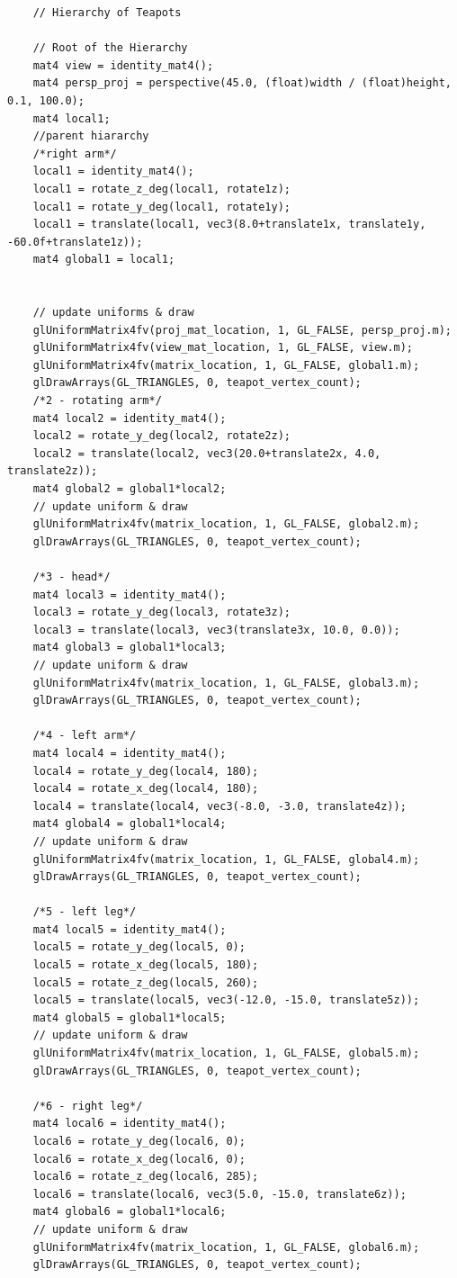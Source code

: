 \documentclass{article}
\begin{document}
\begin{lstlisting}
	// Hierarchy of Teapots

	// Root of the Hierarchy
	mat4 view = identity_mat4();
	mat4 persp_proj = perspective(45.0, (float)width / (float)height, 0.1, 100.0);
	mat4 local1;
	//parent hiararchy
	/*right arm*/
	local1 = identity_mat4();
	local1 = rotate_z_deg(local1, rotate1z);
	local1 = rotate_y_deg(local1, rotate1y);
	local1 = translate(local1, vec3(8.0+translate1x, translate1y, -60.0f+translate1z));
	mat4 global1 = local1;


	// update uniforms & draw
	glUniformMatrix4fv(proj_mat_location, 1, GL_FALSE, persp_proj.m);
	glUniformMatrix4fv(view_mat_location, 1, GL_FALSE, view.m);
	glUniformMatrix4fv(matrix_location, 1, GL_FALSE, global1.m);
	glDrawArrays(GL_TRIANGLES, 0, teapot_vertex_count);
	/*2 - rotating arm*/
	mat4 local2 = identity_mat4();
	local2 = rotate_y_deg(local2, rotate2z);
	local2 = translate(local2, vec3(20.0+translate2x, 4.0, translate2z));
	mat4 global2 = global1*local2;
	// update uniform & draw
	glUniformMatrix4fv(matrix_location, 1, GL_FALSE, global2.m);
	glDrawArrays(GL_TRIANGLES, 0, teapot_vertex_count);

	/*3 - head*/
	mat4 local3 = identity_mat4();
	local3 = rotate_y_deg(local3, rotate3z);
	local3 = translate(local3, vec3(translate3x, 10.0, 0.0));
	mat4 global3 = global1*local3;
	// update uniform & draw
	glUniformMatrix4fv(matrix_location, 1, GL_FALSE, global3.m);
	glDrawArrays(GL_TRIANGLES, 0, teapot_vertex_count);

	/*4 - left arm*/
	mat4 local4 = identity_mat4();
	local4 = rotate_y_deg(local4, 180);
	local4 = rotate_x_deg(local4, 180);
	local4 = translate(local4, vec3(-8.0, -3.0, translate4z));
	mat4 global4 = global1*local4;
	// update uniform & draw
	glUniformMatrix4fv(matrix_location, 1, GL_FALSE, global4.m);
	glDrawArrays(GL_TRIANGLES, 0, teapot_vertex_count);

	/*5 - left leg*/
	mat4 local5 = identity_mat4();
	local5 = rotate_y_deg(local5, 0);
	local5 = rotate_x_deg(local5, 180);
	local5 = rotate_z_deg(local5, 260);
	local5 = translate(local5, vec3(-12.0, -15.0, translate5z));
	mat4 global5 = global1*local5;
	// update uniform & draw
	glUniformMatrix4fv(matrix_location, 1, GL_FALSE, global5.m);
	glDrawArrays(GL_TRIANGLES, 0, teapot_vertex_count);

	/*6 - right leg*/
	mat4 local6 = identity_mat4();
	local6 = rotate_y_deg(local6, 0);
	local6 = rotate_x_deg(local6, 0);
	local6 = rotate_z_deg(local6, 285);
	local6 = translate(local6, vec3(5.0, -15.0, translate6z));
	mat4 global6 = global1*local6;
	// update uniform & draw
	glUniformMatrix4fv(matrix_location, 1, GL_FALSE, global6.m);
	glDrawArrays(GL_TRIANGLES, 0, teapot_vertex_count);


\end{lstlisting}
\end{document}
